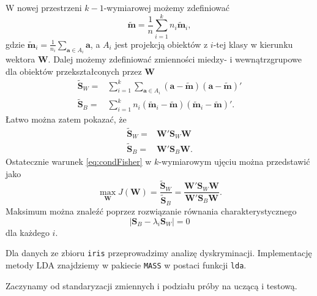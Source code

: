 \documentclass[]{book}
\newenvironment{Shaded}{\begin{snugshade}}{\end{snugshade}}
\newcommand{\DataTypeTok}[1]{\textcolor[rgb]{0.13,0.29,0.53}{#1}}
\newcommand{\DecValTok}[1]{\textcolor[rgb]{0.00,0.00,0.81}{#1}}
\newcommand{\KeywordTok}[1]{\textcolor[rgb]{0.13,0.29,0.53}{\textbf{#1}}}
\newcommand{\NormalTok}[1]{#1}
\newcommand{\OperatorTok}[1]{\textcolor[rgb]{0.81,0.36,0.00}{\textbf{#1}}}
\newcommand{\StringTok}[1]{\textcolor[rgb]{0.31,0.60,0.02}{#1}}
\theoremstyle{plain}
\theoremstyle{definition}
\theoremstyle{definition}
\theoremstyle{definition}
\theoremstyle{definition}
\theoremstyle{remark}
\let\BeginKnitrBlock\begin \let\EndKnitrBlock\end
\begin{document}
W nowej przestrzeni \(k-1\)-wymiarowej możemy zdefiniować
\begin{equation}
    \tilde{\boldsymbol{m}}=\frac{1}{n}\sum_{i=1}^kn_i\tilde{\boldsymbol{m}}_i,
\end{equation}
gdzie \(\tilde{\boldsymbol{m}}_i= \frac{1}{n_i}\sum_{\boldsymbol{a}\in A_i}\boldsymbol{a}\), a \(A_i\) jest projekcją obiektów z \(i\)-tej klasy w kierunku wektora \(\boldsymbol{W}\).
Dalej możemy zdefiniować zmienności miedzy- i wewnątrzgrupowe dla obiektów przekształconych przez \(\boldsymbol{W}\)
\begin{align}
    \tilde{\boldsymbol{S}}_W=&\sum_{i=1}^k\sum_{\boldsymbol{a}\in A_i}(\boldsymbol{a}-\tilde{\boldsymbol{m}})(\boldsymbol{a}-\tilde{\boldsymbol{m}})'\\
    \tilde{\boldsymbol{S}}_B=&\sum_{i=1}^kn_i(\tilde{\boldsymbol{m}}_i-\tilde{\boldsymbol{m}})(\tilde{\boldsymbol{m}}_i-\tilde{\boldsymbol{m}})'.
\end{align}
Łatwo można zatem pokazać, że
\begin{align}
    \tilde{\boldsymbol{S}}_W = & \boldsymbol{W}'\boldsymbol{S}_W\boldsymbol{W}\\
    \tilde{\boldsymbol{S}}_B = & \boldsymbol{W}'\boldsymbol{S}_B\boldsymbol{W}.
\end{align}
Ostatecznie warunek \eqref{eq:condFisher} w \(k\)-wymiarowym ujęciu można przedstawić jako
\begin{equation}
    \max_{\boldsymbol{W}}J(\boldsymbol{W})=\frac{\tilde{\boldsymbol{S}}_W}{\tilde{\boldsymbol{S}}_B}=\frac{\boldsymbol{W}'\boldsymbol{S}_W\boldsymbol{W}}{\boldsymbol{W}'\boldsymbol{S}_B\boldsymbol{W}}.
\end{equation}
Maksimum można znaleźć poprzez rozwiązanie równania charakterystycznego \begin{equation}
    |\boldsymbol{S}_B-\lambda_i\boldsymbol{S}_W|=0
\end{equation}
dla każdego \(i\).

\BeginKnitrBlock{example}
\protect\hypertarget{exm:unnamed-chunk-51}{}{\label{exm:unnamed-chunk-51} }Dla danych ze zbioru \texttt{iris} przeprowadzimy analizę dyskryminacji. Implementację metody LDA znajdziemy w pakiecie \texttt{MASS} w postaci funkcji \texttt{lda}.
\EndKnitrBlock{example}

Zaczynamy od standaryzacji zmiennych i podziału próby na uczącą i testową.

\begin{Shaded}
\end{Shaded}
\end{document}
